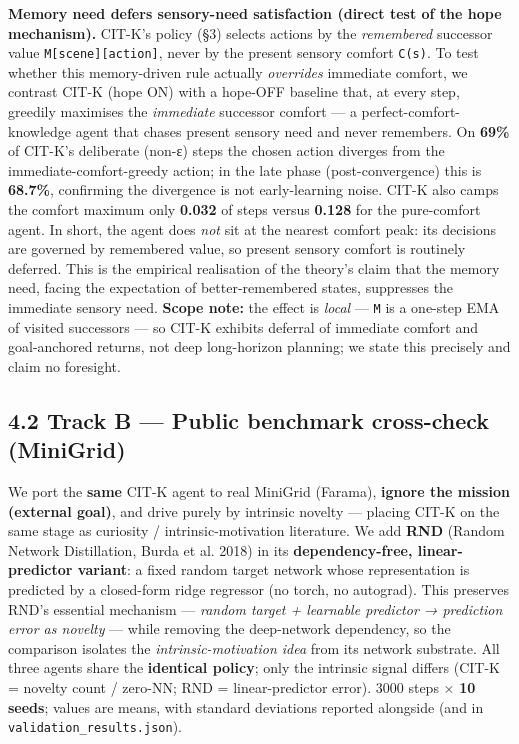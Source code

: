 \documentclass[11pt]{article}
\begin{document}
\textbf{Memory need defers sensory-need satisfaction (direct test of the hope mechanism).} CIT-K's policy (§3) selects actions by the \emph{remembered} successor value \texttt{M[scene][action]}, never by the present sensory comfort \texttt{C(s)}. To test whether this memory-driven rule actually \emph{overrides} immediate comfort, we contrast CIT-K (hope ON) with a hope-OFF baseline that, at every step, greedily maximises the \emph{immediate} successor comfort — a perfect-comfort-knowledge agent that chases present sensory need and never remembers. On \textbf{69\%} of CIT-K's deliberate (non-ε) steps the chosen action diverges from the immediate-comfort-greedy action; in the late phase (post-convergence) this is \textbf{68.7\%}, confirming the divergence is not early-learning noise. CIT-K also camps the comfort maximum only \textbf{0.032} of steps versus \textbf{0.128} for the pure-comfort agent. In short, the agent does \emph{not} sit at the nearest comfort peak: its decisions are governed by remembered value, so present sensory comfort is routinely deferred. This is the empirical realisation of the theory's claim that the memory need, facing the expectation of better-remembered states, suppresses the immediate sensory need. \textbf{Scope note:} the effect is \emph{local} — \texttt{M} is a one-step EMA of visited successors — so CIT-K exhibits deferral of immediate comfort and goal-anchored returns, not deep long-horizon planning; we state this precisely and claim no foresight.

\subsection{4.2 Track B — Public benchmark cross-check (MiniGrid)}
We port the \textbf{same} CIT-K agent to real MiniGrid (Farama), \textbf{ignore the mission (external goal)}, and drive purely by intrinsic novelty — placing CIT-K on the same stage as curiosity / intrinsic-motivation literature. We add \textbf{RND} (Random Network Distillation, Burda et al. 2018) in its \textbf{dependency-free, linear-predictor variant}: a fixed random target network whose representation is predicted by a closed-form ridge regressor (no torch, no autograd). This preserves RND's essential mechanism — \emph{random target + learnable predictor → prediction error as novelty} — while removing the deep-network dependency, so the comparison isolates the \emph{intrinsic-motivation idea} from its network substrate. All three agents share the \textbf{identical policy}; only the intrinsic signal differs (CIT-K = novelty count / zero-NN; RND = linear-predictor error). 3000 steps × \textbf{10 seeds}; values are means, with standard deviations reported alongside (and in \texttt{validation\_results.json}).
\end{document}
